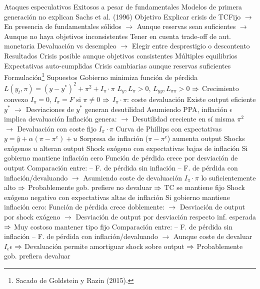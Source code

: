 \documentclass{nuevotema}
\begin{document}
\begin{esquemal}
				\4 Ataques especulativos
				\4[] Exitosos a pesar de fundamentales
				\4[] Modelos de primera generación no explican
				\4 Sachs et al. (1996)
			\3 Objetivo
				\4 Explicar crisis de TCFijo
				\4[] $\to$ En presencia de fundamentales sólidos
				\4[] $\to$ Aunque reservas sean suficientes
				\4[] $\to$ Aunque no haya objetivos inconsistentes
				\4 Tener en cuenta trade-off de aut. monetaria
				\4[] Devaluación vs desempleo
				\4[] $\to$ Elegir entre desprestigio o descontento
			\3 Resultados
				\4 Crisis posible aunque objetivos consistentes
				\4 Múltiples equilibrios
				\4 Expectativas auto-cumplidas
				\4 Crisis cambiarias aunque reservas suficientes
		\2 Formulación\footnote{Sacado de Goldstein y Razin (2015).}
			\3 Supuestos
				\4 Gobierno minimiza función de pérdida
				\4[] $L(y_t, \pi) = (y-y^*)^2 + \pi^2 + I_\pi \cdot \pi$
				\4[] $L_{y}, L_\pi > 0$, $L_{yy}, L_{\pi \pi} > 0$ $\Rightarrow$ Crecimiento convexo
				\4[] $I_\pi = 0$, $I_\pi = F$ si $\pi \neq 0$  $\Rightarrow$ $I_\pi \cdot \pi$: coste devaluación
				\4[] Existe output eficiente $y^*$
				\4[] $\to$ Desviaciones de $y^*$ generan desutilidad
				\4[] Asumiendo PPA, inflación $\epsilon$ implica devaluación
				\4[] Inflación genera:
				\4[] $\to$ Desutilidad creciente en sí misma $\pi^2$
				\4[] $\to$ Devaluación con coste fijo $I_\pi \cdot \pi$
				\4 Curva de Phillips con expectativas
				\4[] $y =  \hat{y} + \alpha (\pi -  \pi^e) + u$
				\4[] Sorpresa de inflación ($\pi - \pi^e$) aumenta output
				\4[] Shocks exógenos $u$ alteran output
			\3 Shock exógeno con expectativas bajas de inflación
				\4 Si gobierno mantiene inflación cero
				\4[] Función de pérdida crece por desviación de output
				\4 Comparación entre:
				\4[] -- F. de pérdida sin inflación
				\4[] -- F. de pérdida con inflación/devaluando
				\4[] $\to$ Asumiendo coste de devaluación $I_\pi \cdot \pi$ lo suficientemente alto
				\4[] $\Rightarrow$ Probablemente gob. prefiere no devaluar
				\4[] $\Rightarrow$ TC se mantiene fijo
			\3 Shock exógeno negativo con expectativas altas de inflación
				\4 Si gobierno mantiene inflación cero:
				\4[] Función de pérdida crece doblemente:
				\4[] $\to$ Desviación de output por shock exógeno
				\4[] $\to$ Desviación de output por desviación respecto inf. esperada
				\4[] $\Rightarrow$ Muy costoso mantener tipo fijo
				\4 Comparación entre:
				\4[] -- F. de pérdida sin inflación
				\4[] -- F. de pérdida con inflación/devaluando
				\4[] $\to$ Aunque coste de devaluar $I_\epsilon \epsilon$
				\4[] $\Rightarrow$ Devaluación permite amortiguar shock sobre output
				\4[] $\Rightarrow$ Probablemente gob. prefiera devaluar

\end{esquemal}
\end{document}
